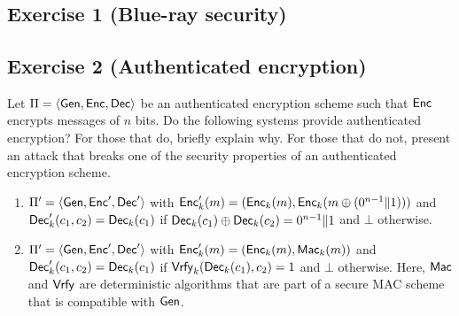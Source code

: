 \section{}
\subsection{Exercise 1 (Blue-ray security)}

\subsection{Exercise 2 (Authenticated encryption)}
Let $\Pi = \langle \Gen, \Enc, \Dec\rangle$ be an authenticated encryption
scheme such that $\Enc$ encrypts messages of $n$ bits.
%
Do the following systems provide authenticated encryption?  For those
that do, briefly explain why.  For those that do not, present an
attack that breaks one of the security properties of an authenticated
encryption scheme.

\begin{enumerate}
	\item $\Pi' = \langle \Gen, \Enc', \Dec'\rangle$ with
	$\Enc'_k(m) = (\Enc_k(m), \Enc_k(m \oplus (0^{n-1}\|1)))$ and
	$\Dec'_k(c_1, c_2) = \Dec_k(c_1)$ if
	$\Dec_k(c_1) \oplus \Dec_k(c_2) = 0^{n-1}\|1$ and $\bot$ otherwise.
	

	\item $\Pi' = \langle \Gen, \Enc', \Dec'\rangle$ with
	$\Enc'_k(m) = (\Enc_k(m), \Mac_k(m))$ and $\Dec'_k(c_1, c_2) = \Dec_k(c_1)$
	if $\Vrfy_k(\Dec_k(c_1), c_2)=1$ and $\bot$ otherwise. Here, $\Mac$
	and $\Vrfy$ are deterministic algorithms that are part of a secure
	MAC scheme that is compatible with $\Gen$.

\end{enumerate}

